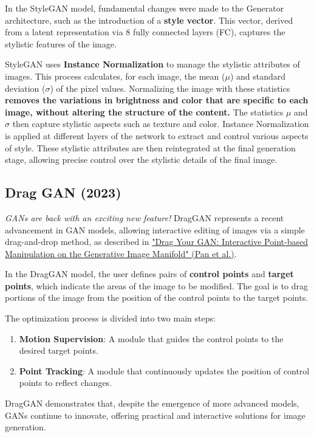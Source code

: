 In the StyleGAN model, fundamental changes were made to the Generator architecture, such as the introduction of a \textbf{style vector}. This vector, derived from a latent representation via 8 fully connected layers (FC), captures the stylistic features of the image.

StyleGAN uses \textbf{Instance Normalization} to manage the stylistic attributes of images. This process calculates, for each image, the mean (\(\mu\)) and standard deviation (\(\sigma\)) of the pixel values. Normalizing the image with these statistics \textbf{removes the variations in brightness and color that are specific to each image, without altering the structure of the content.} The statistics \(\mu\) and \(\sigma\) then capture stylistic aspects such as texture and color. Instance Normalization is applied at different layers of the network to extract and control various aspects of style. These stylistic attributes are then reintegrated at the final generation stage, allowing precise control over the stylistic details of the final image.

\subsection{Drag GAN (2023)}

\textit{GANs are back with an exciting new feature!}  DragGAN represents a recent advancement in GAN models, allowing interactive editing of images via a simple drag-and-drop method, as described in \href{https://vcai.mpi-inf.mpg.de/projects/DragGAN/}{"Drag Your GAN: Interactive Point-based Manipulation on the Generative Image Manifold" (Pan et al.)}.

In the DragGAN model, the user defines pairs of \textbf{control points} and \textbf{target points}, which indicate the areas of the image to be modified. The goal is to drag portions of the image from the position of the control points to the target points.

The optimization process is divided into two main steps:
\begin{enumerate}
    \item \textbf{Motion Supervision}: A module that guides the control points to the desired target points.
    \item \textbf{Point Tracking}: A module that continuously updates the position of control points to reflect changes.
\end{enumerate}

DragGAN demonstrates that, despite the emergence of more advanced models, GANs continue to innovate, offering practical and interactive solutions for image generation.


